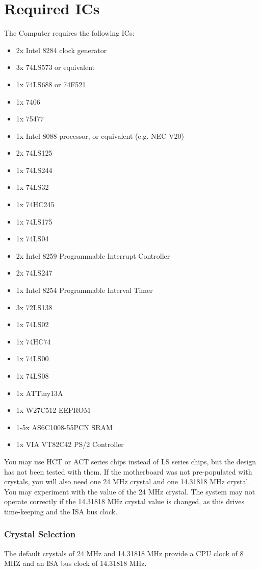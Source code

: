 \documentclass[twoside,10pt,letterpaper]{refart}
\begin{document}
\section{Required ICs}
The  Computer requires the following ICs:
\begin{itemize}
    \item 2x Intel 8284 clock generator
    \item 3x 74LS573 or equivalent
    \item 1x 74LS688 or 74F521
    \item 1x 7406
    \item 1x 75477
    \item 1x Intel 8088 processor, or equivalent (e.g. NEC V20)
    \item 2x 74LS125
    \item 1x 74LS244
    \item 1x 74LS32
    \item 1x 74HC245
    \item 1x 74LS175
    \item 1x 74LS04
    \item 2x Intel 8259 Programmable Interrupt Controller
    \item 2x 74LS247
    \item 1x Intel 8254 Programmable Interval Timer
    \item 3x 72LS138
    \item 1x 74LS02
    \item 1x 74HC74
    \item 1x 74LS00
    \item 1x 74LS08
    \item 1x ATTiny13A
    \item 1x W27C512 EEPROM
    \item 1-5x AS6C1008-55PCN SRAM
    \item 1x VIA VT82C42 PS/2 Controller
\end{itemize}

You may use HCT or ACT series chips instead of LS series chips, but the design has not
been tested with them. If the motherboard was not pre-populated with crystals, you will
also need one 24 MHz crystal and one 14.31818 MHz crystal. You may experiment with the
value of the 24 MHz crystal. The system may not operate correctly if the 14.31818 MHz
crystal value is changed, as this drives time-keeping and the ISA bus clock.

\subsubsection{Crystal Selection}
The default crystals of 24 MHz and 14.31818 MHz provide a CPU clock of 8 MHZ and an ISA
bus clock of 14.31818 MHz.
\end{document}
